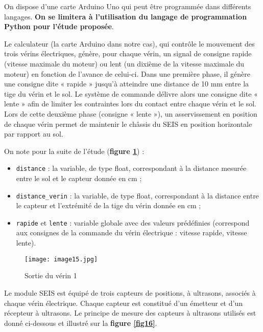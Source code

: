 On dispose d'une carte Arduino Uno qui peut être programmée dans
différents langages. \textbf{On se limitera à l'utilisation du
langage de programmation Python pour l'étude proposée}.

Le calculateur (la carte Arduino dans notre cas), qui contrôle le
mouvement des trois vérins électriques, génère, pour chaque vérin, un
signal de consigne rapide (vitesse maximale du moteur) ou lent (un
dixième de la vitesse maximale du moteur) en fonction de l'avance de
celui-ci. Dans une première phase, il génère une consigne dite « rapide
» jusqu'à atteindre une distance de 10 mm entre la tige du vérin et le
sol. Le système de commande délivre alors une consigne dite « lente »
afin de limiter les contraintes lors du contact entre chaque vérin et le
sol. Lors de cette deuxième phase (consigne « lente »), un
asservissement en position de chaque vérin permet de maintenir le
châssis du SEIS en position horizontale par rapport au sol.

On note pour la suite de l'étude (\textbf{figure \ref{fig15}}) :

\begin{itemize}
\item
  \texttt{distance} : la variable, de type float, correspondant à la
  distance mesurée entre le sol et le capteur donnée en cm ;
\item
  \texttt{distance\_verin} : la variable, de type float, correspondant à
  la distance entre le capteur et l'extrémité de la tige du vérin donnée
  en cm ;
\item
  \texttt{rapide} et \texttt{lente} : variable globale avec des valeurs
  prédéfinies (correspond aux consignes de la commande du vérin électrique : vitesse rapide, vitesse lente).
\end{itemize}


\begin{figure}[!htb]
\begin{center}
\texttt{[image: image15.jpg]}
\caption{Sortie du vérin 1 \label{fig15}}
\end{center}
\end{figure}



Le module SEIS est équipé de trois
capteurs de positions, à ultrasons, associés à chaque vérin électrique.
Chaque capteur est constitué d'un émetteur et d'un récepteur à
ultrasons. Le principe de mesure des capteurs à ultrasons utilisés est
donné ci-dessous et illustré sur la \textbf{figure \ref{fig16}}.

